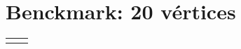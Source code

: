 \documentclass[10pt]{article}
\begin{document}
\centering

\section*{Benckmark: 20 v\'ertices}

\begin{tabular}{|c|c|}
\hline
\begin{minipage}{0.5\linewidth}
\scriptsize 
 
\end{minipage} 
& 
\begin{minipage}{0.5\linewidth}
\scriptsize
 
\end{minipage} 
\\
\hline
\begin{minipage}{0.5\linewidth}
\scriptsize

\end{minipage}
&
\begin{minipage}{0.5\linewidth}
\scriptsize

\end{minipage}
\\
\hline
\end{tabular}
\end{document}
